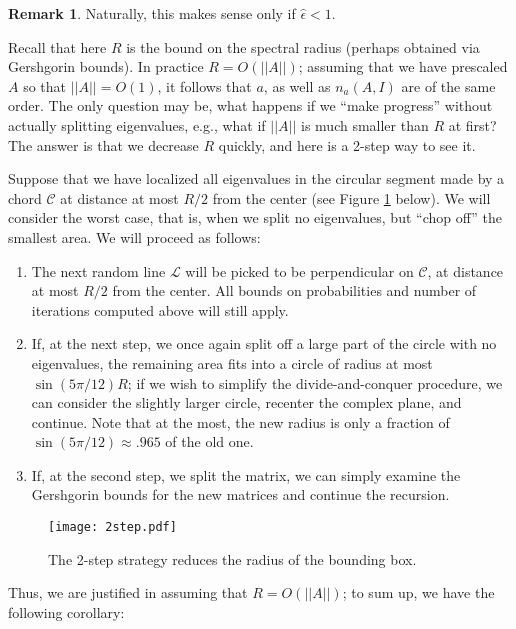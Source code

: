 \documentclass{article}
\theoremstyle{definition}
\newtheorem{remark}[theorem]{Remark}
\begin{document}
\begin{remark} Naturally, this makes sense only if $\hat{\epsilon}< 1$. \end{remark}

Recall that here $R$ is the bound on the spectral radius (perhaps obtained via Gershgorin bounds). In practice $R = O(||A||)$; assuming that we have prescaled $A$ so that $||A|| = O(1)$, it follows that $a$, as well as $n_a(A,I)$ are of the same order. The only question may be, what happens if we ``make progress'' without actually splitting eigenvalues, e.g., what if $||A||$ is much smaller than $R$ at first? The answer is that we decrease $R$ quickly, and here is a 2-step way to see it.

Suppose that we have localized all eigenvalues in the circular segment made by a chord $\mathcal{C}$ at distance at most $R/2$ from the center (see Figure \ref{2step} below). We will consider the worst case, that is, when we split no eigenvalues, but ``chop off'' the smallest area. We will proceed as follows: \begin{enumerate}
\item The next random line $\mathcal{L}$ will be picked to be perpendicular on $\mathcal{C}$, at distance at most $R/2$ from the center. All bounds on probabilities and number of iterations computed above will still apply.
\item If, at the next step, we once again split off a large part of the circle with no eigenvalues, the remaining area fits into a circle of radius at most $\sin(5 \pi/12)R$; if we wish to simplify the divide-and-conquer procedure, we can consider the slightly larger circle, recenter the complex plane, and continue. Note that at the most, the new radius is only a fraction of $\sin(5\pi/12) \approx .965$ of the old one.
\item If, at the second step, we split the matrix, we can simply examine the Gershgorin bounds for the new matrices and continue the recursion. 
\end{enumerate}

\begin{figure}[ht!]
\begin{center}
\texttt{[image: 2step.pdf]}
\caption{The 2-step strategy reduces the radius of the bounding box.} \label{2step}
\end{center}
\end{figure}

Thus, we are justified in assuming that $R = O(||A||)$; to sum up, we have the following corollary:
\end{document}
